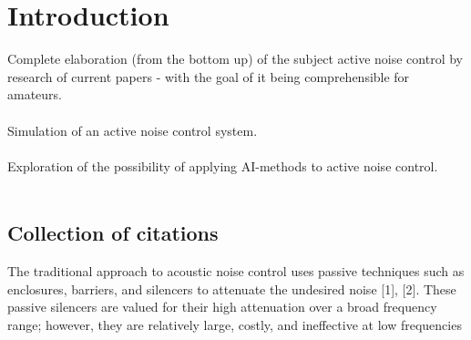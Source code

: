 \chapter{Introduction}
\label{chap:introduction}

Complete elaboration (from the bottom up) of the subject active noise control by research of current papers - with the goal of it being comprehensible for amateurs.
\\
\\
Simulation of an active noise control system.
\\
\\
Exploration of the possibility of applying AI-methods to active noise control.
\\
\\
\section{Collection of citations}
The traditional approach to acoustic noise control uses passive techniques such as enclosures, barriers, and silencers to attenuate the undesired noise [1], [2]. These passive silencers are valued for their high attenuation over a broad frequency range; however, they are relatively large, costly, and ineffective at low frequencies\cite{}